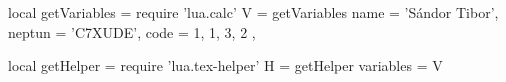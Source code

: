 \usepackage{luacode}

\begin{luacode}
  local getVariables = require 'lua.calc'
  V = getVariables {
      name = 'Sándor Tibor',
      neptun = 'C7XUDE',
      code = { 1, 1, 3, 2 },
    }

  local getHelper = require 'lua.tex-helper'
  H = getHelper {
      variables = V
    }
\end{luacode}

\usepackage{xargs}
\newcommand{\lv}[1]{\directlua{H.printVar [[#1]]}}
\newcommand{\lvec}[2]{\directlua{H.printVec { name="#1", index=#2 } }}
